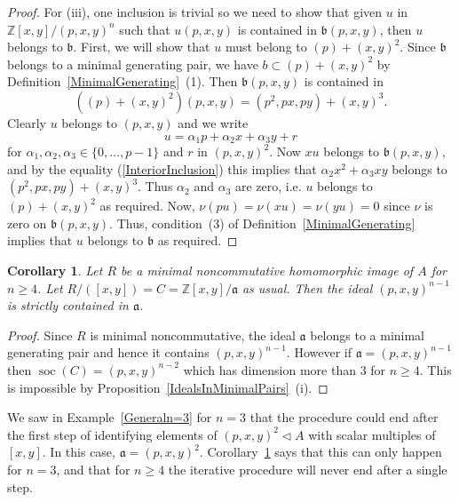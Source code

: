 \documentclass[11pt]{article}
\DeclareMathOperator{\soc}{soc}
\newtheorem{corollary}{Corollary}[section]
\theoremstyle{definition}
\begin{document}
\begin{proof}
For (iii), one inclusion is trivial so we need to show that given $u$ in $\mathbb{Z}[x,y]/(p,x,y)^n$ such that $u(p,x,y)$ is contained in $\mathfrak{b}(p,x,y)$, then $u$ belongs to $\mathfrak{b}$. First, we will show that $u$ must belong to $(p)+(x,y)^2$. Since $\mathfrak{b}$ belongs to a minimal generating pair, we have $b\subset (p)+(x,y)^2$ by Definition~\ref{MinimalGenerating}~(1). Then $\mathfrak{b}(p,x,y)$ is contained in
\begin{equation}\label{InteriorInclusion}
\left((p)+(x,y)^2\right)(p,x,y)=(p^2,px,py)+(x,y)^3.
\end{equation}
Clearly $u$ belongs to $(p,x,y)$ and we write
\[u=\alpha_1 p+\alpha_2 x+\alpha_3 y+r\]
for $\alpha_1,\alpha_2,\alpha_3\in\lbrace 0,\ldots,p-1\rbrace$ and $r$ in $(p,x,y)^2$. Now $xu$ belongs to $\mathfrak{b}(p,x,y)$, and by the equality (\ref{InteriorInclusion}) this implies that $\alpha_2 x^2+\alpha_3xy$ belongs to $(p^2,px,py)+(x,y)^3$. Thus $\alpha_2$ and $\alpha_3$ are zero, i.e. $u$ belongs to $(p)+(x,y)^2$ as required. Now, $\nu(pu)=\nu(xu)=\nu(yu)=0$ since $\nu$ is zero on $\mathfrak{b}(p,x,y)$. Thus, condition~(3) of Definition~\ref{MinimalGenerating} implies that $u$ belongs to $\mathfrak{b}$ as required.
\end{proof}

\begin{corollary}\label{MoreThanOneStep}
Let $R$ be a minimal noncommutative homomorphic image of $A$ for $n\geq 4$. Let $R/([x,y])=C=\mathbb{Z}[x,y]/\mathfrak{a}$ as usual. Then the ideal $(p,x,y)^{n-1}$ is strictly contained in $\mathfrak{a}$.
\end{corollary}

\begin{proof}
Since $R$ is minimal noncommutative, the ideal $\mathfrak{a}$ belongs to a minimal generating pair and hence it contains $(p,x,y)^{n-1}$. However if $\mathfrak{a}=(p,x,y)^{n-1}$ then $\soc(C)=(p,x,y)^{n-2}$ which has dimension more than $3$ for $n\geq 4$. This is impossible by Proposition~\ref{IdealsInMinimalPairs}~(i).
\end{proof}

We saw in Example~\ref{Generaln=3} for $n=3$ that the procedure could end after the first step of identifying elements of $(p,x,y)^2\lhd A$ with scalar multiples of $[x,y]$. In this case, $\mathfrak{a}=(p,x,y)^2$. Corollary~\ref{MoreThanOneStep} says that this can only happen for $n=3$, and that for $n\geq 4$ the iterative procedure will never end after a single step.
\end{document}
